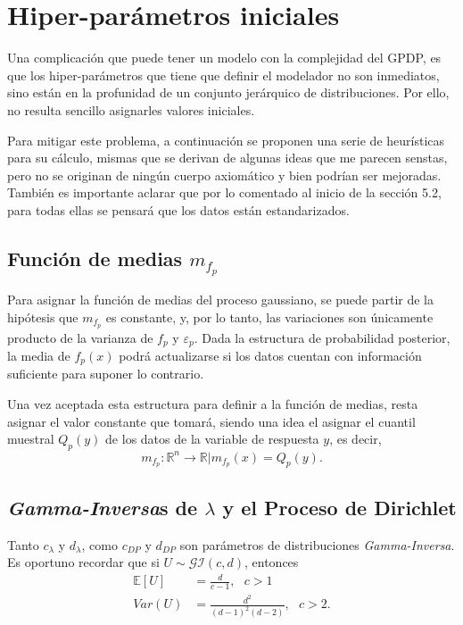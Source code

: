 \section{Hiper-par\'ametros iniciales}

Una complicaci\'on que puede tener un modelo con la complejidad del GPDP, es que los hiper-par\'ametros que tiene que definir el modelador no son inmediatos, sino est\'an en la profunidad de un conjunto jer\'arquico de distribuciones. Por ello, no resulta sencillo asignarles valores iniciales.

Para mitigar este problema, a continuaci\'on se proponen una serie de heur\'isticas para su c\'alculo, mismas que se derivan de algunas ideas que me parecen senstas, pero no se originan de ning\'un cuerpo axiom\'atico y bien podr\'ian ser mejoradas. Tambi\'en es importante aclarar que por lo comentado al inicio de la secci\'on 5.2, para todas ellas se pensar\'a que los datos est\'an estandarizados.

\subsection{Funci\'on de medias $m_{f_p}$}

Para asignar la funci\'on de medias del proceso gaussiano, se puede partir de la hip\'otesis que $m_{f_p}$ es constante, y, por lo tanto, las variaciones son \'unicamente producto de la varianza de $f_p$ y $\varepsilon_p$. Dada la estructura de probabilidad posterior, la media de $f_p(x)$ podr\'a actualizarse si los datos cuentan con informaci\'on suficiente para suponer lo contrario. 

Una vez aceptada esta estructura para definir a la funci\'on de medias, resta asignar el valor constante que tomar\'a, siendo una idea el asignar el cuantil muestral $Q_p(y)$ de los datos de la variable de respuesta $y$, es decir,
\begin{equation*}
    m_{f_p}:\mathbb{R}^n \rightarrow \mathbb{R} | m_{f_p}(x) = Q_p(y).
\end{equation*}

\subsection{\textit{Gamma-Inversa}s de $\lambda$ y el Proceso de Dirichlet}

Tanto $c_\lambda$ y $d_\lambda$, como $c_{DP}$ y $d_{DP}$ son par\'ametros de distribuciones \textit{Gamma-Inversa}. Es oportuno recordar que si $U \sim \mathcal{GI}(c,d)$, entonces
\begin{equation*}
\begin{aligned}
    \mathbb{E}[U] &= \frac{d}{c-1}, \text{ } c>1\\
    Var(U) &= \frac{d^2}{(d-1)^2(d-2)}, \text{ } c>2.
\end{aligned}
\end{equation*}

